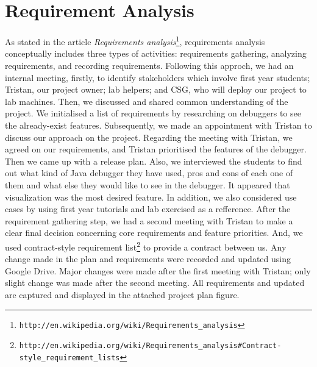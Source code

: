 \documentclass[11pt]{article}
\begin{document}
\section{Requirement Analysis}
As stated in the article \textit{Requirements analysis}\footnote{\tt{http://en.wikipedia.org/wiki/Requirements\_analysis}}, requirements analysis conceptually includes three types of activities: requirements gathering, analyzing requirements, and recording requirements.
Following this approch, we had an internal meeting, firstly, to identify stakeholders which involve first year students; Tristan, our project owner; lab helpers; and CSG, who will deploy our project to lab machines. Then, we discussed and shared common understanding of the project. We initialised a list of requirements by researching on debuggers to see the already-exist features. Subsequently, we made an appointment with Tristan to discuss our approach on the project. Regarding the meeting with Tristan, we agreed on our requirements, and Tristan prioritised the features of the debugger. Then we came up with a release plan. Also, we interviewed the students to find out what kind of Java debugger they have used, pros and cons of each one of them and what else they would like to see in the debugger. It appeared that visualization was the most desired feature. In addition, we also considered use cases by using first year tutorials and lab exercised as a refference. After the requirement gathering step, we had a second meeting with Tristan to make a clear final decision concerning core requirements and feature priorities. And, we used contract-style requirement list\footnote{\tt{http://en.wikipedia.org/wiki/Requirements\_analysis\#Contract-style\_requirement\_lists}} to provide a contract between us.
Any change made in the plan and requirements were recorded and updated using Google Drive. Major changes were made after the first meeting with Tristan; only slight change was made after the second meeting.
All requirements and updated are captured and displayed in the attached project plan figure.
\end{document}
